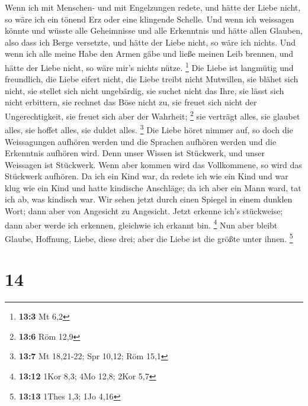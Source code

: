 Wenn ich mit Menschen- und mit Engelzungen redete, und
hätte der Liebe nicht, so wäre ich ein tönend Erz oder eine klingende
Schelle.  Und wenn ich weissagen könnte und wüsste alle
Geheimnisse und alle Erkenntnis und hätte allen Glauben, also dass ich
Berge versetzte, und hätte der Liebe nicht, so wäre ich nichts.
 Und wenn ich alle meine Habe den Armen gäbe und ließe
meinen Leib brennen, und hätte der Liebe nicht, so wäre mir's nichts
nütze. \footnote{\textbf{13:3} Mt 6,2}  Die Liebe ist
langmütig und freundlich, die Liebe eifert nicht, die Liebe treibt nicht
Mutwillen, sie blähet sich nicht,  sie stellet sich nicht
ungebärdig, sie suchet nicht das Ihre, sie lässt sich nicht erbittern,
sie rechnet das Böse nicht zu,  sie freuet sich nicht der
Ungerechtigkeit, sie freuet sich aber der Wahrheit; \footnote{\textbf{13:6}
  Röm 12,9}  sie verträgt alles, sie glaubet alles, sie
hoffet alles, sie duldet alles. \footnote{\textbf{13:7} Mt 18,21-22; Spr
  10,12; Röm 15,1}  Die Liebe höret nimmer auf, so doch
die Weissagungen aufhören werden und die Sprachen aufhören werden und
die Erkenntnis aufhören wird.  Denn unser Wissen ist
Stückwerk, und unser Weissagen ist Stückwerk.  Wenn aber
kommen wird das Vollkommene, so wird das Stückwerk aufhören.
 Da ich ein Kind war, da redete ich wie ein Kind und war
klug wie ein Kind und hatte kindische Anschläge; da ich aber ein Mann
ward, tat ich ab, was kindisch war.  Wir sehen jetzt
durch einen Spiegel in einem dunklen Wort; dann aber von Angesicht zu
Angesicht. Jetzt erkenne ich's stückweise; dann aber werde ich erkennen,
gleichwie ich erkannt bin. \footnote{\textbf{13:12} 1Kor 8,3; 4Mo 12,8;
  2Kor 5,7}  Nun aber bleibt Glaube, Hoffnung, Liebe,
diese drei; aber die Liebe ist die größte unter ihnen. \footnote{\textbf{13:13}
  1Thes 1,3; 1Jo 4,16}

\hypertarget{section-13}{%
\section{14}\label{section-13}}

